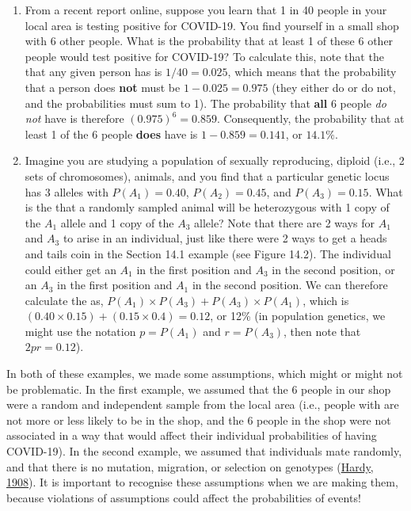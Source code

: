 \documentclass[
  openany]{krantz}
\begin{document}
\begin{enumerate}
\def\labelenumi{\arabic{enumi}.}
\item
  From a recent report online, suppose you learn that 1 in 40 people in your local area is testing positive for COVID-19. You find yourself in a small shop with 6 other people. What is the probability that at least 1 of these 6 other people would test positive for COVID-19? To calculate this, note that the  that any given person has  is \(1/40 = 0.025\), which means that the probability that a person does \textbf{not} must be \(1 - 0.025 = 0.975\) (they either do or do not, and the probabilities must sum to 1). The probability that \textbf{all} 6 people \emph{do not} have  is therefore \((0.975)^6 = 0.859\). Consequently, the probability that at least 1 of the 6 people \textbf{does} have  is \(1 - 0.859 = 0.141\), or \(14.1\%\).
\item
  Imagine you are studying a population of sexually reproducing, diploid (i.e., 2 sets of chromosomes), animals, and you find that a particular genetic locus has 3 alleles with  \(P(A_{1}) = 0.40\), \(P(A_{2}) = 0.45\), and \(P(A_{3}) = 0.15\). What is the  that a randomly sampled animal will be heterozygous with 1 copy of the \(A_{1}\) allele and 1 copy of the \(A_{3}\) allele? Note that there are 2 ways for \(A_{1}\) and \(A_{3}\) to arise in an individual, just like there were 2 ways to get a heads and tails coin in the Section 14.1 example (see Figure 14.2). The individual could either get an \(A_{1}\) in the first position and \(A_{3}\) in the second position, or an \(A_{3}\) in the first position and \(A_{1}\) in the second position. We can therefore calculate the  as, \(P(A_{1}) \times P(A_{3}) + P(A_{3}) \times P(A_{1})\), which is \((0.40 \times 0.15) + (0.15 \times 0.4) = 0.12\), or 12\% (in population genetics, we might use the notation \(p = P(A_{1})\) and \(r = P(A_{3})\), then note that \(2pr = 0.12\)).
\end{enumerate}

In both of these examples, we made some assumptions, which might or might not be problematic.
In the first example, we assumed that the 6 people in our shop were a random and independent sample from the local area (i.e., people with  are not more or less likely to be in the shop, and the 6 people in the shop were not associated in a way that would affect their individual probabilities of having COVID-19).
In the second example, we assumed that individuals mate randomly, and that there is no mutation, migration, or selection on genotypes (\protect\hyperlink{ref-Hardy1908}{Hardy, 1908}).
It is important to recognise these assumptions when we are making them, because violations of assumptions could affect the probabilities of events!
\end{document}
